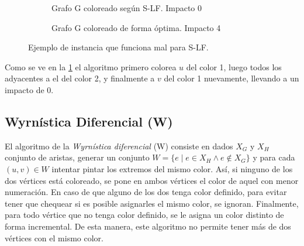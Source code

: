\begin{figure}[H]
\begin{subfigure}[H]{0.45\textwidth}
        \caption{Grafo G coloreado según S-LF. Impacto 0}
    \end{subfigure}
    \begin{subfigure}[H]{0.45\textwidth}
        \centering
        \caption{Grafo G coloreado de forma óptima. Impacto 4}
    \end{subfigure}
    \caption{Ejemplo de instancia que funciona mal para S-LF.}
    \label{fig:s-lf-patologico}
\end{figure}

Como se ve en la \cref{fig:s-lf-patologico} el algoritmo primero colorea $u$ del color 1, luego todos los adyacentes a el del color 2, y finalmente a $v$ del color 1 nuevamente, llevando a un impacto de 0.

\subsection{Wyrnística Diferencial (W)}

El algoritmo de la \textit{Wyrnística diferencial} (W) consiste en dados $X_G$ y $X_H$ conjunto de aristas, generar un conjunto $W = \{ e \mid e \in X_H \wedge e \notin X_G\}$ y para cada $(u, v) \in W$ intentar pintar los extremos del mismo color. Así, si ninguno de los dos vértices está coloreado, se pone en ambos vértices el color de aquel con menor numeración. En caso de que alguno de los dos tenga color definido, para evitar tener que chequear si es posible asignarles el mismo color, se ignoran. Finalmente, para todo vértice que no tenga color definido, se le asigna un color distinto de forma incremental. De esta manera, este algoritmo no permite tener más de dos vértices con el mismo color.

